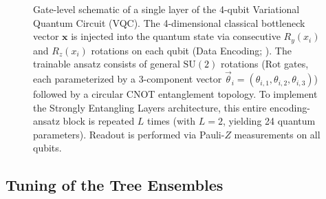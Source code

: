 \documentclass[11pt,a4paper]{article}
\begin{document}
\begin{figure}[htbp]
    \centering
    \caption{Gate-level schematic of a single layer of the 4-qubit Variational Quantum Circuit
    (VQC). The 4-dimensional classical bottleneck vector $\mathbf{x}$ is injected into the quantum
    state via consecutive $R_y(x_i)$ and $R_z(x_i)$ rotations on each qubit (Data Encoding; \citealp{perez2020}). The trainable ansatz consists of general
    $\mathrm{SU}(2)$ rotations ($\mathrm{Rot}$ gates, each parameterized by a 3-component vector
    $\vec\theta_i = (\theta_{i,1}, \theta_{i,2}, \theta_{i,3})$) followed by a circular CNOT
    entanglement topology. To implement the Strongly Entangling Layers architecture, this entire
    encoding-ansatz block is repeated $L$ times (with $L=2$, yielding 24 quantum parameters). Readout is performed via Pauli-$Z$ measurements on
    all qubits.}
    \label{fig:vqc_circuit}
\end{figure}

\subsection{Tuning of the Tree Ensembles}
\label{app:hyperparams}
\end{document}
